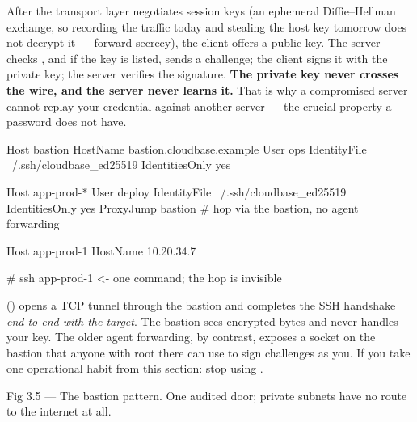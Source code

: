  After the transport layer negotiates session keys (an ephemeral Diffie--Hellman exchange, so recording the traffic today and stealing the host key tomorrow does not decrypt it --- forward secrecy), the client offers a public key. The server checks , and if the key is listed, sends a challenge; the client signs it with the private key; the server verifies the signature. \textbf{The private key never crosses the wire, and the server never learns it.} That is why a compromised server cannot replay your credential against another server --- the crucial property a password does not have.

\begin{bashbox}
Host bastion
  HostName bastion.cloudbase.example
  User ops
  IdentityFile ~/.ssh/cloudbase_ed25519
  IdentitiesOnly yes

Host app-prod-*
  User deploy
  IdentityFile ~/.ssh/cloudbase_ed25519
  IdentitiesOnly yes
  ProxyJump bastion            # hop via the bastion, no agent forwarding

Host app-prod-1
  HostName 10.20.34.7

# ssh app-prod-1     <- one command; the hop is invisible
\end{bashbox}

  () opens a TCP tunnel through the bastion and completes the SSH handshake \emph{end to end with the target}. The bastion sees encrypted bytes and never handles your key. The older  agent forwarding, by contrast, exposes a socket on the bastion that anyone with root there can use to sign challenges as you. If you take one operational habit from this section: stop using .

\begin{wbfigure}{Fig 3.5 — The bastion pattern. One audited door; private subnets have no route to the internet at all.}
\end{wbfigure}

